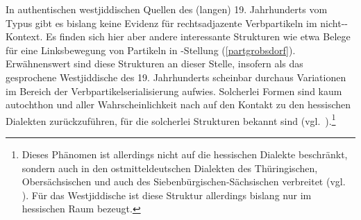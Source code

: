 
In authentischen westjiddischen Quellen des (langen) 19. Jahrhunderts vom Typus  gibt es bislang keine Evidenz für rechtsadjazente Verbpartikeln im nicht--Kontext. Es finden sich hier aber andere interessante Strukturen wie etwa Belege für eine Linksbewegung von Partikeln in -Stellung (\ref{partgrobsdorf}). Erwähnenswert sind diese Strukturen an dieser Stelle, insofern als das gesprochene Westjiddische des 19. Jahrhunderts scheinbar durchaus Variationen im Bereich der Verbpartikelserialisierung aufwies. Solcherlei Formen sind kaum autochthon  und aller Wahrscheinlichkeit nach auf den Kontakt zu den hessischen Dialekten zurückzuführen, für die solcherlei Strukturen bekannt sind (vgl.\, \citealt{SchallertSchwalm}).\footnote{Dieses Phänomen ist allerdings nicht auf die hessischen Dialekte beschränkt, sondern auch in den ostmitteldeutschen Dialekten des Thüringischen,  Obersächsischen und auch des Siebenbürgischen-Sächsischen verbreitet (vgl.\, \citealt{SchallertSchwalm,Sift2016}). Für das Westjiddische ist diese Struktur allerdings bislang nur im hessischen Raum bezeugt.}

